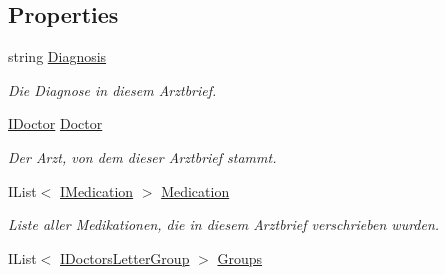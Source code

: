 \subsection*{Properties}
\begin{CompactItemize}
\item 
\hypertarget{interfacemy_m_d_1_1_model_interface_1_1_data_model_interface_1_1_i_doctors_letter_523223d6c6fe8798f0d70f376ffc99b8}{
string \hyperlink{interfacemy_m_d_1_1_model_interface_1_1_data_model_interface_1_1_i_doctors_letter_523223d6c6fe8798f0d70f376ffc99b8}{Diagnosis}}
\label{db/d8c/interfacemy_m_d_1_1_model_interface_1_1_data_model_interface_1_1_i_doctors_letter_523223d6c6fe8798f0d70f376ffc99b8}

\begin{CompactList}\small\item\em Die Diagnose in diesem Arztbrief. \item\end{CompactList}\item 
\hypertarget{interfacemy_m_d_1_1_model_interface_1_1_data_model_interface_1_1_i_doctors_letter_cbb67c65f2abd1005d46939a7b3aff5f}{
\hyperlink{interfacemy_m_d_1_1_model_interface_1_1_data_model_interface_1_1_i_doctor}{IDoctor} \hyperlink{interfacemy_m_d_1_1_model_interface_1_1_data_model_interface_1_1_i_doctors_letter_cbb67c65f2abd1005d46939a7b3aff5f}{Doctor}}
\label{db/d8c/interfacemy_m_d_1_1_model_interface_1_1_data_model_interface_1_1_i_doctors_letter_cbb67c65f2abd1005d46939a7b3aff5f}

\begin{CompactList}\small\item\em Der Arzt, von dem dieser Arztbrief stammt. \item\end{CompactList}\item 
\hypertarget{interfacemy_m_d_1_1_model_interface_1_1_data_model_interface_1_1_i_doctors_letter_353bd6f65060d17097c3b03141e79cce}{
IList$<$ \hyperlink{interfacemy_m_d_1_1_model_interface_1_1_data_model_interface_1_1_i_medication}{IMedication} $>$ \hyperlink{interfacemy_m_d_1_1_model_interface_1_1_data_model_interface_1_1_i_doctors_letter_353bd6f65060d17097c3b03141e79cce}{Medication}}
\label{db/d8c/interfacemy_m_d_1_1_model_interface_1_1_data_model_interface_1_1_i_doctors_letter_353bd6f65060d17097c3b03141e79cce}

\begin{CompactList}\small\item\em Liste aller Medikationen, die in diesem Arztbrief verschrieben wurden. \item\end{CompactList}\item 
\hypertarget{interfacemy_m_d_1_1_model_interface_1_1_data_model_interface_1_1_i_doctors_letter_a37ede293936e29279ed543129451ec3}{
IList$<$ \hyperlink{interfacemy_m_d_1_1_model_interface_1_1_data_model_interface_1_1_i_doctors_letter_group}{IDoctors\-Letter\-Group} $>$ \hyperlink{interfacemy_m_d_1_1_model_interface_1_1_data_model_interface_1_1_i_doctors_letter_a37ede293936e29279ed543129451ec3}{Groups}}
\label{db/d8c/interfacemy_m_d_1_1_model_interface_1_1_data_model_interface_1_1_i_doctors_letter_a37ede293936e29279ed543129451ec3}


\end{CompactItemize}
